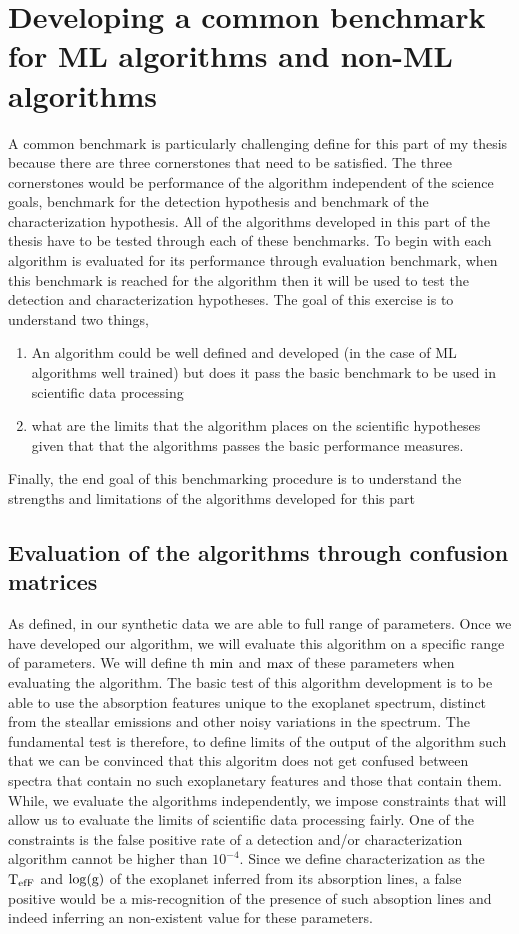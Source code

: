 \section{Developing a common benchmark for ML algorithms and non-ML algorithms}
A common benchmark is particularly challenging define for this part of my thesis because there are three cornerstones that need to be satisfied.
The three cornerstones would be performance of the algorithm independent of the science goals, benchmark for the detection hypothesis and benchmark of the characterization hypothesis.
All of the algorithms developed in this part of the thesis have to be tested through each of these benchmarks. 
To begin with each algorithm is evaluated for its performance through evaluation benchmark, when this benchmark is reached for the algorithm then it will be used to test the detection and characterization hypotheses.
The goal of this exercise is to understand two things,
\begin{enumerate}
    \item An algorithm could be well defined and developed (in the case of ML algorithms well trained) but does it pass the basic benchmark to be used in scientific data processing
    \item what are the limits that the algorithm places on the scientific hypotheses given that that the algorithms passes the basic performance measures.
\end{enumerate}
Finally, the end goal of this benchmarking procedure is to understand the strengths and limitations of the algorithms developed for this part
\subsection{ Evaluation of the algorithms through confusion matrices}
As defined, in our synthetic data we are able to full range of parameters. 
Once we have developed our algorithm, we will evaluate this algorithm on a specific range of parameters.
We will define th $\rm{min}$ and $\rm{max}$ of these parameters when evaluating the  algorithm.
The basic test of this algorithm development is to be able to use the absorption features unique to the exoplanet spectrum, distinct from the steallar emissions and other noisy variations in the spectrum.
The fundamental test is therefore, to define limits of the output of the algorithm such that we can be convinced that this algoritm does not get confused between spectra that contain no such exoplanetary features and those that contain them.
While, we evaluate the algorithms independently, we impose constraints that will allow us to evaluate the limits of scientific data processing fairly.
One of the constraints is the false positive rate of a detection and/or characterization algorithm cannot be higher than $10^{-4}$.
Since we define characterization as the $\rm{T_{efF}}$ and $\rm{\log(g)}$ of the exoplanet inferred from its absorption lines, a false positive would be a mis-recognition of the presence of such absoption lines and indeed inferring an non-existent value for these parameters.

